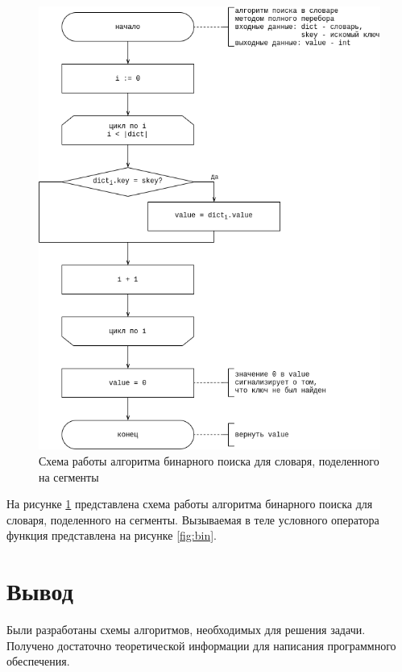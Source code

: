 \begin{center}
	\begin{figure}[H]
		\centering
		\includegraphics[width=0.95\linewidth]{assets/dict-segment.drawio.png}
		\caption{Схема работы алгоритма бинарного поиска для словаря, поделенного на сегменты}
		\label{fig:seg}
	\end{figure}
\end{center}

На рисунке \ref{fig:seg} представлена схема работы алгоритма бинарного поиска для словаря, поделенного на сегменты. Вызываемая в теле условного оператора функция представлена на рисунке \ref{fig:bin}.

\section{Вывод}

Были разработаны схемы алгоритмов, необходимых для решения задачи. Получено достаточно теоретической информации для написания программного обеспечения.
